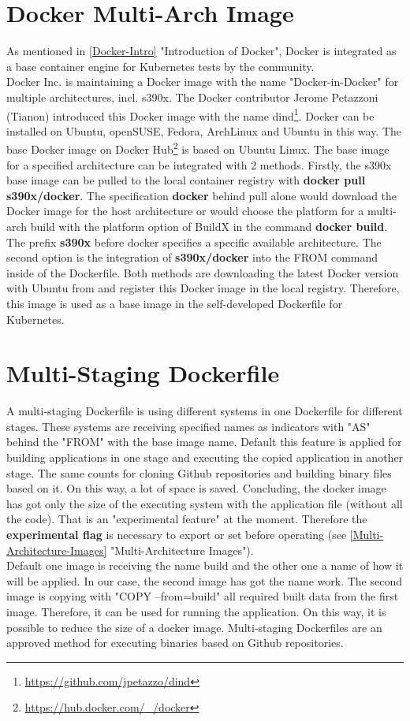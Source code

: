 \section{Docker Multi-Arch Image}
As mentioned in \ref{Docker-Intro} "Introduction of Docker", Docker is integrated as a base container engine for Kubernetes tests by the community. \\  
Docker Inc. is maintaining a Docker image with the name "Docker-in-Docker" for multiple architectures, incl. s390x. 
The Docker contributor Jerome Petazzoni (Tianon) introduced this Docker image with the name dind\footnote{\url{https://github.com/jpetazzo/dind}}. Docker can be installed on Ubuntu, openSUSE, Fedora, ArchLinux and Ubuntu in this way.
The base Docker image on Docker Hub\footnote{\url{https://hub.docker.com/_/docker}} is based on Ubuntu Linux.
The base image for a specified architecture can be integrated with 2 methods. Firstly, the s390x base image can be pulled to the local container registry with \textbf{docker pull s390x/docker}. The specification \textbf{docker} behind pull alone would download the Docker image for the host architecture or would choose the platform for a multi-arch build with the platform option of BuildX in the command \textbf{docker build}. The prefix \textbf{s390x} before docker specifies a specific available architecture. 
The second option is the integration of \textbf{s390x/docker} into the FROM command inside of the Dockerfile. Both methods are downloading the latest Docker version with Ubuntu from  and register this Docker image in the local registry.
Therefore, this image is used as a base image in the self-developed Dockerfile for Kubernetes.



\section{Multi-Staging Dockerfile}

A multi-staging Dockerfile is using different systems in one Dockerfile for different stages. These systems are receiving specified names as indicators with "AS" behind the "FROM" with the base image name. 
Default this feature is applied for building applications in one stage and executing the copied application in another stage. The same counts for cloning Github repositories and building binary files based on it. On this way, a lot of space is saved.
Concluding, the docker image has got only the size of the executing system with the application file (without all the code). 
That is an "experimental feature"  at the moment. Therefore the \textbf{experimental flag} is necessary to export or set before operating (see \ref{Multi-Architecture-Images} "Multi-Architecture Images"). \\
Default one image is receiving the name build and the other one a name of how it will be applied. In our case, the second image has got the name work. 
The second image is copying with "COPY --from=build" all required built data from the first image. Therefore, it can be used for running the application. 
On this way, it is possible to reduce the size of a docker image. 
Multi-staging Dockerfiles are an approved method for executing binaries based on Github repositories.


